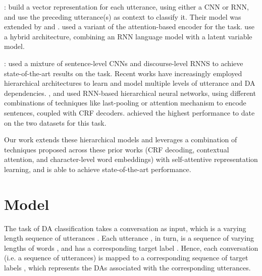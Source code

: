 \documentclass[11pt,a4paper]{article}
\begin{document}
:  build a vector representation for each utterance, using either a CNN or RNN, and use the preceding utterance(s) as context to classify it. Their model was extended by  and .   used a variant of the attention-based encoder for the task.  use a hybrid architecture, combining an RNN language model with a latent variable model.

:  used a mixture of sentence-level CNNs and discourse-level RNNS to achieve state-of-the-art results on the task. Recent works \cite{li2016multi, liu2017using} have increasingly employed hierarchical architectures to learn and model multiple levels of utterance and DA dependencies. 
,  and  used RNN-based hierarchical neural networks, using different combinations of techniques like last-pooling or attention mechanism to encode sentences, coupled with CRF decoders.   achieved the highest performance to date on the two datasets for this task.

Our work extends these hierarchical models and leverages a combination of techniques proposed across these prior works (CRF decoding, contextual attention, and character-level word embeddings) with self-attentive representation learning, and is able to achieve state-of-the-art performance. 

\section{Model}
The task of DA classification
takes a conversation  as input, which is a varying length sequence of utterances . Each utterance , in turn, is a sequence of varying lengths of words  , and has a corresponding target label . Hence, each conversation (i.e. a sequence of utterances) is mapped to a corresponding sequence of target labels , which represents the DAs associated with the corresponding utterances.
\end{document}
